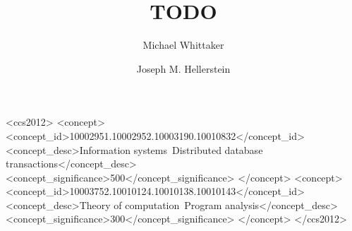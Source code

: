 \documentclass[sigconf, review]{acmart}
\begin{document}
\title{TODO}

\author{Michael Whittaker}

\author{Joseph M. Hellerstein}

{}

\begin{CCSXML}
<ccs2012>
<concept>
<concept_id>10002951.10002952.10003190.10010832</concept_id>
<concept_desc>Information systems~Distributed database transactions</concept_desc>
<concept_significance>500</concept_significance>
</concept>
<concept>
<concept_id>10003752.10010124.10010138.10010143</concept_id>
<concept_desc>Theory of computation~Program analysis</concept_desc>
<concept_significance>300</concept_significance>
</concept>
</ccs2012>
\end{CCSXML}

\maketitle
{}
{}
{}
{}
{}
{}
{}
{}
{}
{}


\appendix
{}
{}
\end{document}
